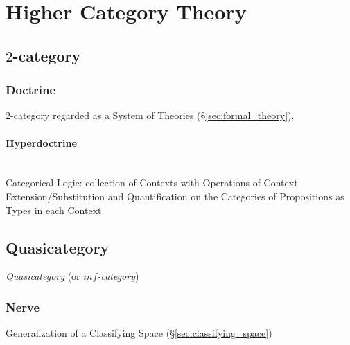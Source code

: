 \section{Higher Category Theory}\label{sec:higher_category}

\subsection{$2$-category}\label{sec:2_category}



\subsubsection{Doctrine}\label{sec:doctrine}

$2$-category regarded as a System of Theories
(\S\ref{sec:formal_theory}).



\paragraph{Hyperdoctrine}\label{sec:hyperdoctrine}
\hfill \\

Categorical Logic: collection of Contexts with Operations of Context
Extension/Substitution and Quantification on the Categories of
Propositions as Types in each Context



\subsection{Quasicategory}\label{sec:quasicategory}

\emph{Quasicategory} (or \emph{$inf$-category})



\subsubsection{Nerve}\label{sec:nerve}

Generalization of a Classifying Space (\S\ref{sec:classifying_space})



